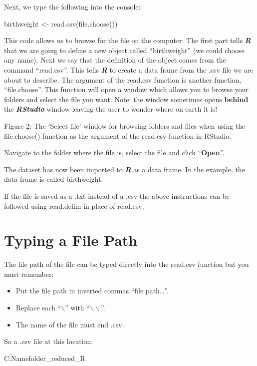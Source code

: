 \documentclass[
]{book}
\providecommand{\tightlist}{%
  \setlength{\itemsep}{0pt}\setlength{\parskip}{0pt}}
\begin{document}
Next, we type the following into the console:

birthweight \textless- read.csv(file.choose())

This code allows us to browse for the file on the computer. The first part tells \textbf{\emph{R}} that we are going to define a new object called ``birthweight'' (we could choose any name). Next we say that the definition of the object comes from the command ``read.csv''. This tells \textbf{\emph{R}} to create a data frame from the .csv file we are about to describe. The argument of the read.csv function is another function, ``file.choose''. This function will open a window which allows you to browse your folders and select the file you want. Note: the window sometimes opens \textbf{behind} the \textbf{\emph{RStudio}} window leaving the user to wonder where on earth it is!

Figure 2: The `Select file' window for browsing folders and files when using the file.choose() function as the argument of the read.csv function in RStudio.

Navigate to the folder where the file is, select the file and click ``\textbf{Open}''.

The dataset has now been imported to \textbf{\emph{R}} as a data frame. In the example, the data frame is called birthweight.

If the file is saved as a .txt instead of a .csv the above instructions can be followed using read.delim in place of read.csv.

\section{Typing a File Path}\label{typing-a-file-path}

The file path of the file can be typed directly into the read.csv function but you must remember:

\begin{itemize}
\tightlist
\item
  Put the file path in inverted commas ``file path\ldots{}''.
\item
  Replace each ``\(\backslash\)'' with ``\(\backslash \backslash\)''.
\item
  The name of the file must end .csv.
\end{itemize}

So a .csv file at this location:

C:\Users\User Name\Documents\Example folder\Birthweight\_reduced\_R
\end{document}
